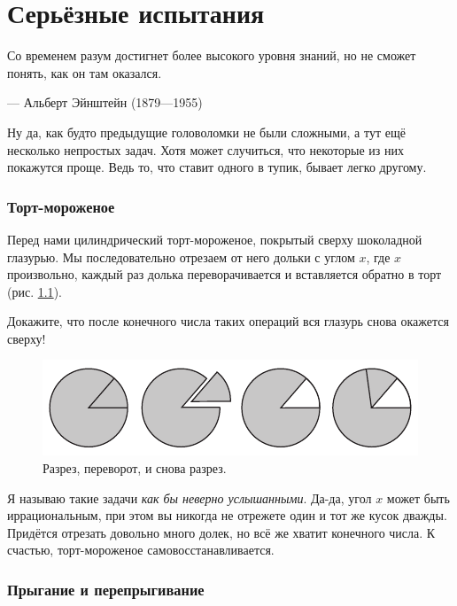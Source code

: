 \chapter{Серьёзные испытания}


\setlength{\epigraphwidth}{.80\textwidth}
\epigraph{Со временем разум достигнет более высокого уровня знаний, но не сможет понять, как он там оказался.
}{--- Альберт Эйнштейн (1879---1955)}

Ну да, как будто предыдущие головоломки не были сложными, а тут ещё несколько непростых задач.
Хотя может случиться, что некоторые из них покажутся проще.
Ведь то, что ставит одного в тупик, бывает легко другому.


\subsection*{Торт-мороженое}\label{Торт-мороженое}

Перед нами цилиндрический торт-мороженое, покрытый сверху шоколадной глазурью.
Мы последовательно отрезаем от него дольки с углом $x$, где $x$ произвольно,
каждый раз долька переворачивается и вставляется обратно в торт
(рис. \ref{pic:tort}).

Докажите, что после конечного числа таких операций вся глазурь снова окажется сверху!


\begin{figure}[htb!]
\centering
\includegraphics[scale=1]{pics/tort}
\caption{Разрез, переворот, и снова разрез.}
\label{pic:tort}
\end{figure}

Я называю такие задачи \emph{как бы неверно услышанными}.
Да-да, угол $x$ может быть иррациональным, 
при этом вы никогда не отрежете один и тот же кусок дважды.
Придётся отрезать довольно много долек, но всё же хватит конечного числа.
К счастью, торт-мороженое самовосстанавливается.

\subsection*{Прыгание и перепрыгивание}

